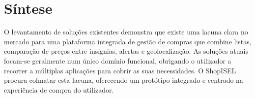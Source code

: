 \section{Síntese}
\label{sec:3.5}

O levantamento de soluções existentes demonstra que existe uma lacuna clara no mercado para uma plataforma integrada de gestão de compras que combine listas, comparação de preços entre insígnias, alertas e geolocalização. As soluções atuais focam-se geralmente num único domínio funcional, obrigando o utilizador a recorrer a múltiplas aplicações para cobrir as suas necessidades. O ShopISEL procura colmatar esta lacuna, oferecendo um protótipo integrado e centrado na experiência de compra do utilizador.
